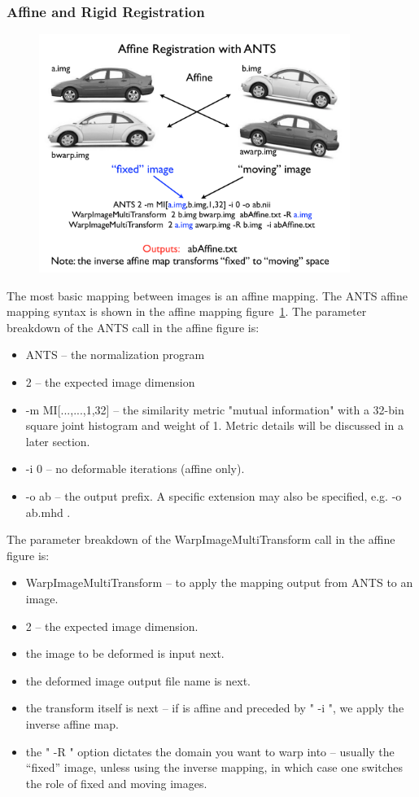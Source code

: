 \documentclass{InsightArticle}
\begin{document}
\subsubsection{Affine and Rigid Registration}
\begin{figure}
\includegraphics[width=0.9\textwidth]{./Figures/ANTSanatomy.pdf} 
\vspace{-0.1in}
\label{fig:aff}
\end{figure}
The most basic mapping between images is an affine mapping. The ANTS 
affine mapping syntax is shown in the affine mapping figure~\ref{fig:aff}. The
parameter breakdown of the ANTS call in the affine figure is:
\begin{itemize}
\item  ANTS -- the normalization program
\item 2 -- the expected image dimension
\item -m MI[...,...,1,32] -- the similarity metric "mutual information" with a 32-bin square joint histogram and weight of 1.  
Metric details will be discussed in a later section. 
\item -i 0 -- no deformable iterations (affine only).
\item -o ab -- the output prefix.  A specific extension may also be specified, e.g.   -o ab.mhd  .
\end{itemize}
The parameter breakdown of the WarpImageMultiTransform call in the affine figure is:
\begin{itemize}
\item WarpImageMultiTransform -- to apply the mapping output from ANTS to an image.
\item 2 -- the expected image dimension.
\item the image to be deformed is input next.
\item the deformed image output file name is next.
\item the transform itself is next -- if is affine and preceded by " -i ", we apply the inverse affine map.
\item the " -R " option dictates the domain you want to warp into -- usually the ``fixed'' image, unless using the inverse mapping, in which case one switches the role of fixed and moving images. 
\end{itemize}
\end{document}
